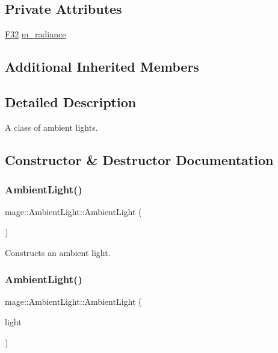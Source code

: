 \subsection*{Private Attributes}
\begin{DoxyCompactItemize}
\item 
\hyperlink{namespacemage_aa97e833b45f06d60a0a9c4fc22ae02c0}{F32} \hyperlink{classmage_1_1_ambient_light_a579aff19284637d89d85026b373574aa}{m\+\_\+radiance}
\end{DoxyCompactItemize}
\subsection*{Additional Inherited Members}


\subsection{Detailed Description}
A class of ambient lights. 

\subsection{Constructor \& Destructor Documentation}
\hypertarget{classmage_1_1_ambient_light_a753dd42af4b6ad15b2f0867a99d6aabe}{}\label{classmage_1_1_ambient_light_a753dd42af4b6ad15b2f0867a99d6aabe} 
\subsubsection{\texorpdfstring{Ambient\+Light()}{AmbientLight()}\hspace{0.1cm}{\footnotesize\ttfamily [1/3]}}
{\footnotesize\ttfamily mage\+::\+Ambient\+Light\+::\+Ambient\+Light (\begin{DoxyParamCaption}{ }\end{DoxyParamCaption})}

Constructs an ambient light. \hypertarget{classmage_1_1_ambient_light_ac5295d1f90e64d3e59ff2856df32a187}{}\label{classmage_1_1_ambient_light_ac5295d1f90e64d3e59ff2856df32a187} 
\subsubsection{\texorpdfstring{Ambient\+Light()}{AmbientLight()}\hspace{0.1cm}{\footnotesize\ttfamily [2/3]}}
{\footnotesize\ttfamily mage\+::\+Ambient\+Light\+::\+Ambient\+Light (\begin{DoxyParamCaption}\item[{const \hyperlink{classmage_1_1_ambient_light}{Ambient\+Light} \&}]{light }\end{DoxyParamCaption})\hspace{0.3cm}{\ttfamily [default]}}

